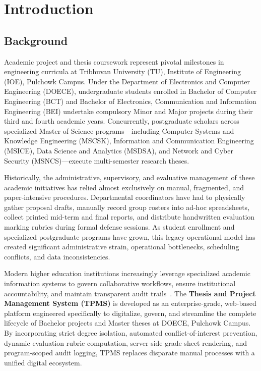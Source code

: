 \chapter{Introduction}

\section{Background}
Academic project and thesis coursework represent pivotal milestones in engineering curricula at Tribhuvan University (TU), Institute of Engineering (IOE), Pulchowk Campus. Under the Department of Electronics and Computer Engineering (DOECE), undergraduate students enrolled in Bachelor of Computer Engineering (BCT) and Bachelor of Electronics, Communication and Information Engineering (BEI) undertake compulsory Minor and Major projects during their third and fourth academic years. Concurrently, postgraduate scholars across specialized Master of Science programs---including Computer Systems and Knowledge Engineering (MSCSK), Information and Communication Engineering (MSICE), Data Science and Analytics (MSDSA), and Network and Cyber Security (MSNCS)---execute multi-semester research theses.

Historically, the administrative, supervisory, and evaluative management of these academic initiatives has relied almost exclusively on manual, fragmented, and paper-intensive procedures. Departmental coordinators have had to physically gather proposal drafts, manually record group rosters into ad-hoc spreadsheets, collect printed mid-term and final reports, and distribute handwritten evaluation marking rubrics during formal defense sessions. As student enrollment and specialized postgraduate programs have grown, this legacy operational model has created significant administrative strain, operational bottlenecks, scheduling conflicts, and data inconsistencies.

Modern higher education institutions increasingly leverage specialized academic information systems to govern collaborative workflows, ensure institutional accountability, and maintain transparent audit trails~\citep{pressman2015software, ko2021systematic}. The \textbf{Thesis and Project Management System (TPMS)} is developed as an enterprise-grade, web-based platform engineered specifically to digitalize, govern, and streamline the complete lifecycle of Bachelor projects and Master theses at DOECE, Pulchowk Campus. By incorporating strict degree isolation, automated conflict-of-interest prevention, dynamic evaluation rubric computation, server-side grade sheet rendering, and program-scoped audit logging, TPMS replaces disparate manual processes with a unified digital ecosystem.

